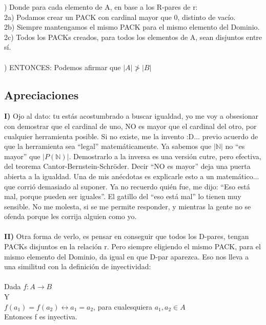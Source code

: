 	) Donde para cada elemento de A, en base a los R-pares de r:\\
	2a) Podamos crear un PACK con cardinal mayor que 0, distinto de vacío.\\
	2b) Siempre mantengamos el mismo PACK para el mismo elemento del Dominio.\\
	2c) Todos los PACKs creados, para todos los elementos de A, sean disjuntos entre sí.
	\\\\
	
	) ENTONCES: Podemos afirmar que $|A| \ngtr |B|$
	
	
	\subsection{Apreciaciones}
	
	\noindent
	\textbf{I)} Ojo al dato: tu estás acostumbrado a buscar igualdad, yo me voy a obsesionar con demostrar que el cardinal de uno, NO es mayor que el cardinal del otro, por cualquier herramienta posible. Si no existe, me la invento :D... previo acuerdo de que la herramienta sea ``legal'' matemáticamente. Ya sabemos que $|\mathbb{N}|$ no ``es mayor'' que $|P(\mathbb{N})|$. Demostrarlo a la inversa es una versión cutre, pero efectiva, del teorema Cantor-Bernstein-Schröder. Decir ``NO es mayor'' deja una puerta abierta a la igualdad. Una de mis anécdotas es explicarle esto a un matemático... que corrió demasiado al suponer. Ya no recuerdo quién fue, me dijo: ``Eso está mal, porque pueden ser iguales''. El gatillo del ``eso está mal'' lo tienen muy sensible. No me molesta, si se me permite responder, y mientras la gente no se ofenda porque les corrija alguien como yo.\\\\
	
	\noindent
	\textbf{II)} Otra forma de verlo, es pensar en conseguir que todos los D-pares, tengan PACKs disjuntos en la relación r. Pero siempre eligiendo el mismo PACK, para el mismo elemento del Dominio, da igual en que D-par aparezca. Eso nos lleva a una similitud con la definición de inyectividad:\\\\
	Dada $f: A \rightarrow B$\\
	Y\\
	$f(a_{1}) = f(a_{2}) \leftrightarrow a_{1} = a_{2}$, para cualesquiera $a_{1},a_{2} \in A$\\
	Entonces f es inyectiva.\\\\
	
